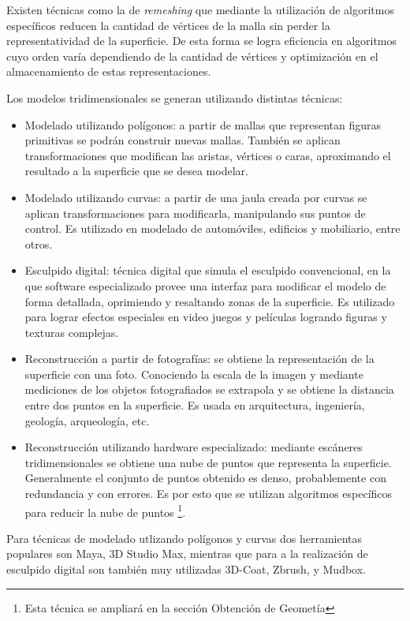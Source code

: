 Existen técnicas como la de \emph{remeshing} que mediante la utilización de algoritmos específicos reducen la cantidad de vértices de la malla sin perder la representatividad de la superficie. De esta forma se logra eficiencia en algoritmos cuyo orden varía dependiendo de la cantidad de vértices y optimización en el almacenamiento de estas representaciones. 


Los modelos tridimensionales se generan utilizando distintas técnicas:
\begin{itemize}
  \item Modelado utilizando polígonos: a partir de mallas que representan figuras primitivas se podrán construir nuevas mallas.
  También se aplican transformaciones que modifican las aristas, vértices o caras, aproximando el resultado a la superficie que se desea modelar.
  \item  Modelado utilizando curvas: a partir de una jaula creada por curvas se aplican transformaciones para modificarla, manipulando sus puntos de control. Es utilizado en modelado de automóviles, edificios y mobiliario, entre otros.

  \item Esculpido digital: técnica digital que simula el esculpido convencional, en la que software especializado provee una interfaz para modificar el modelo de forma detallada, oprimiendo y resaltando zonas de la superficie. Es utilizado para lograr efectos especiales en video juegos y películas logrando figuras y texturas complejas.

  \item Reconstrucción a partir de fotografías: se obtiene la representación de la superficie con una foto. Conociendo la escala de la imagen y mediante mediciones de los objetos fotografiados se extrapola y se obtiene la distancia entre dos puntos en la superficie. Es usada en arquitectura, ingeniería, geología, arqueología, etc.
  \item Reconstrucción utilizando hardware especializado: mediante escáneres tridimensionales se obtiene una nube de puntos que representa la superficie. Generalmente el conjunto de puntos obtenido es denso, probablemente con redundancia y con errores. Es por esto que se utilizan algoritmos específicos para reducir la nube de puntos \footnote{Esta técnica se ampliará en la sección Obtención de Geometía}.
  \end{itemize}
Para técnicas de modelado utlizando polígonos y curvas dos herramientas populares son  Maya, 3D Studio Max, mientras que para a la realización de esculpido digital son también muy utilizadas 3D-Coat, Zbrush, y Mudbox. 
  
